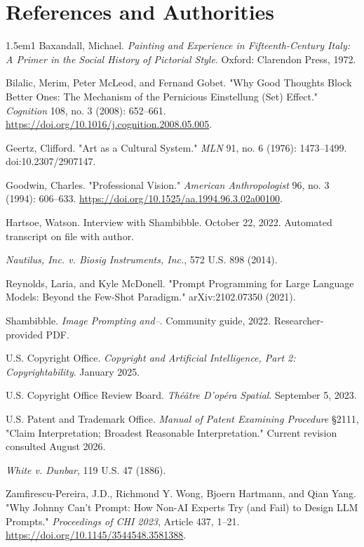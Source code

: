 \documentclass[11pt]{article}
\begin{document}
\section*{References and Authorities}
\begingroup
\footnotesize
\setlength{\parskip}{0.18em}
\begin{hangparas}{1.5em}{1}
Baxandall, Michael. \textit{Painting and Experience in Fifteenth-Century Italy: A Primer in the Social History of Pictorial Style}. Oxford: Clarendon Press, 1972.

Bilalic, Merim, Peter McLeod, and Fernand Gobet. "Why Good Thoughts Block Better Ones: The Mechanism of the Pernicious Einstellung (Set) Effect." \textit{Cognition} 108, no. 3 (2008): 652--661. \url{https://doi.org/10.1016/j.cognition.2008.05.005}.

Geertz, Clifford. "Art as a Cultural System." \textit{MLN} 91, no. 6 (1976): 1473--1499. doi:10.2307/2907147.

Goodwin, Charles. "Professional Vision." \textit{American Anthropologist} 96, no. 3 (1994): 606--633. \url{https://doi.org/10.1525/aa.1994.96.3.02a00100}.

Hartsoe, Watson. Interview with Shambibble. October 22, 2022. Automated transcript on file with author.

\textit{Nautilus, Inc. v. Biosig Instruments, Inc.}, 572 U.S. 898 (2014).

Reynolds, Laria, and Kyle McDonell. "Prompt Programming for Large Language Models: Beyond the Few-Shot Paradigm." arXiv:2102.07350 (2021).

Shambibble. \textit{Image Prompting and--}. Community guide, 2022. Researcher-provided PDF.

U.S. Copyright Office. \textit{Copyright and Artificial Intelligence, Part 2: Copyrightability}. January 2025.

U.S. Copyright Office Review Board. \textit{Th\'e\^atre D'op\'era Spatial}. September 5, 2023.

U.S. Patent and Trademark Office. \textit{Manual of Patent Examining Procedure} \S 2111, "Claim Interpretation; Broadest Reasonable Interpretation." Current revision consulted August 2026.

\textit{White v. Dunbar}, 119 U.S. 47 (1886).

Zamfirescu-Pereira, J.D., Richmond Y. Wong, Bjoern Hartmann, and Qian Yang. "Why Johnny Can't Prompt: How Non-AI Experts Try (and Fail) to Design LLM Prompts." \textit{Proceedings of CHI 2023}, Article 437, 1--21. \url{https://doi.org/10.1145/3544548.3581388}.
\end{hangparas}
\endgroup
\end{document}

